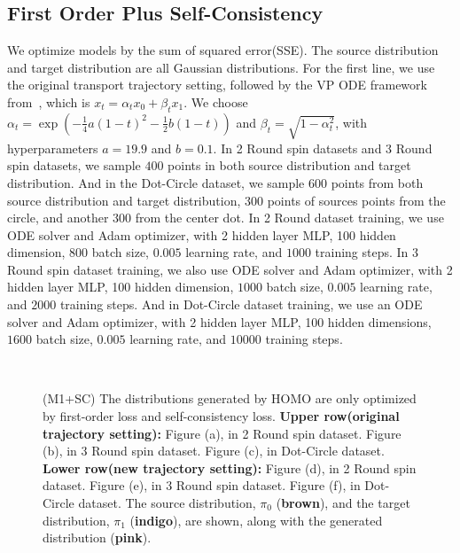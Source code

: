 \subsection{First Order Plus Self-Consistency}\label{sec:app:3rd_first_order_plus_self_consistency}
We optimize models by the sum of squared error(SSE). The source distribution and target distribution are all Gaussian distributions. For the first line, we use the original transport trajectory setting, followed by the VP ODE framework from~\cite{rectified_flow}, which is $x_t = \alpha_t x_0 + \beta_t x_1$. We choose $\alpha_t = \exp(-\frac{1}{4} a(1-t)^2 - \frac{1}{2} b(1-t))$ and $\beta_t = \sqrt{1 - \alpha_t^2}$, with hyperparameters $a = 19.9$ and $b = 0.1$. In 2 Round spin datasets and 3 Round spin datasets, we sample $400$ points in both source distribution and target distribution. And in the Dot-Circle dataset, we sample $600$ points from both source distribution and target distribution, $300$ points of sources points from the circle, and another $300$ from the center dot. In 2 Round dataset training, we use ODE solver and Adam optimizer, with 2 hidden layer MLP, 100 hidden dimension, $800$ batch size, $0.005$ learning rate, and $1000$ training steps. In 3 Round spin dataset training, we also use ODE solver and Adam optimizer, with 2 hidden layer MLP, 100 hidden dimension, $1000$ batch size, $0.005$ learning rate, and $2000$ training steps. And in Dot-Circle dataset training, we use an ODE solver and Adam optimizer, with 2 hidden layer MLP, 100 hidden dimensions, $1600$ batch size, $0.005$ learning rate, and $10000$ training steps. 
\begin{figure}[!ht]
\centering
{}
 \\
\caption{
(M1+SC)
The distributions generated by HOMO are only optimized by first-order loss and self-consistency loss. 
\textbf{Upper row(original trajectory setting):}
Figure (a), in 2 Round spin dataset. Figure (b), in 3 Round spin dataset. 
Figure (c), in Dot-Circle dataset. 
\textbf{Lower row(new trajectory setting):}
Figure (d), in 2 Round spin dataset. 
Figure (e), in 3 Round spin dataset. 
Figure (f), in Dot-Circle dataset. 
The source distribution, $\pi_0$ ({\textbf{brown}}), and the target distribution, $\pi_1$ ({\textbf{indigo}}), are shown, along with the generated distribution ({\textbf{pink}}). 
}
\label{fig:3rd_first_order_plus_self_consistency}
\end{figure}


